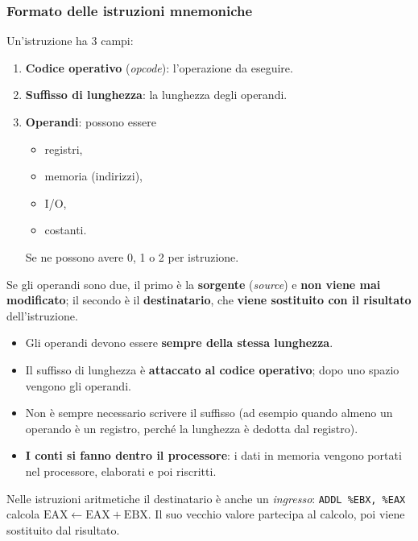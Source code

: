 \documentclass[11pt,a4paper]{article}
\begin{document}
\subsubsection*{Formato delle istruzioni mnemoniche}

Un'istruzione ha 3 campi:
\begin{enumerate}[leftmargin=*]
  \item \textbf{Codice operativo} (\emph{opcode}): l'operazione da eseguire.
  \item \textbf{Suffisso di lunghezza}: la lunghezza degli operandi.
  \item \textbf{Operandi}: possono essere
  \begin{itemize}
    \item registri,
    \item memoria (indirizzi),
    \item I/O,
    \item costanti.
  \end{itemize}
  Se ne possono avere 0, 1 o 2 per istruzione.
\end{enumerate}

Se gli operandi sono due, il primo è la \textbf{sorgente} (\emph{source}) e \textbf{non viene mai modificato}; il secondo è il \textbf{destinatario}, che \textbf{viene sostituito con il risultato} dell'istruzione.

\begin{nota}
\begin{itemize}[leftmargin=*]
  \item Gli operandi devono essere \textbf{sempre della stessa lunghezza}.
  \item Il suffisso di lunghezza è \textbf{attaccato al codice operativo}; dopo uno spazio vengono gli operandi.
  \item Non è sempre necessario scrivere il suffisso (ad esempio quando almeno un operando è un registro, perché la lunghezza è dedotta dal registro).
  \item \textbf{I conti si fanno dentro il processore}: i dati in memoria vengono portati nel processore, elaborati e poi riscritti.
\end{itemize}
\end{nota}

\begin{integrazione}
Nelle istruzioni aritmetiche il destinatario è anche un \emph{ingresso}: \texttt{ADDL \%EBX, \%EAX} calcola $\text{EAX} \leftarrow \text{EAX} + \text{EBX}$. Il suo vecchio valore partecipa al calcolo, poi viene sostituito dal risultato.
\end{integrazione}
\end{document}
